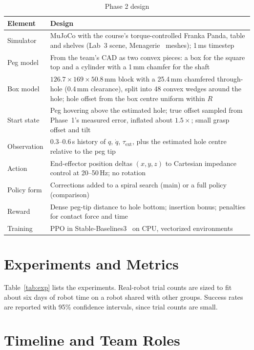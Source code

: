 \documentclass[conference]{IEEEtran}
\newcommand{\tauext}{\tau_{\mathrm{ext}}}
\begin{document}
\begin{table}[t]
\caption{Phase 2 design}
\label{tab:phase2}
\centering
\footnotesize
\begin{tabularx}{\columnwidth}{@{}>{\raggedright\arraybackslash}p{1.45cm}L@{}}
\toprule
Element & Design \\
\midrule
Simulator & MuJoCo with the course's torque-controlled Franka Panda, table and shelves (Lab~3 scene, Menagerie~\cite{menagerie2022} meshes); 1\,ms timestep \\
Peg model & From the team's CAD as two convex pieces: a box for the square top and a cylinder with a 1\,mm chamfer for the shaft \\
Box model & $126.7\times169\times50.8$\,mm block with a 25.4\,mm chamfered through-hole (0.4\,mm clearance), split into 48 convex wedges around the hole; hole offset from the box centre uniform within $R$ \\
Start state & Peg hovering above the estimated hole; true offset sampled from Phase~1's measured error, inflated about $1.5\times$; small grasp offset and tilt \\
Observation & 0.3--0.6\,s history of $q$, $\dot q$, $\tauext$, plus the estimated hole centre relative to the peg tip \\
Action & End-effector position deltas $(x,y,z)$ to Cartesian impedance control at 20--50\,Hz; no rotation \\
Policy form & Corrections added to a spiral search (main) or a full policy (comparison) \\
Reward & Dense peg-tip distance to hole bottom; insertion bonus; penalties for contact force and time \\
Training & PPO in Stable-Baselines3~\cite{raffin2021sb3} on CPU, vectorized environments \\
\bottomrule
\end{tabularx}
\end{table}

\section{Experiments and Metrics}

Table~\ref{tab:exp} lists the experiments. Real-robot trial counts are sized to
fit about six days of robot time on a robot shared with other groups. Success
rates are reported with 95\% confidence intervals, since trial counts are small.


\section{Timeline and Team Roles}
\end{document}
